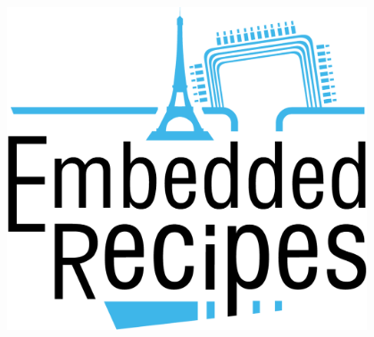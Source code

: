 \begin{frame}
\begin{columns}
\begin{center}
      \includegraphics[width=0.8\textwidth]{slides/linux-references/embedded-recipes.png}\\
    \end{center}
  \end{columns}
\end{frame}
